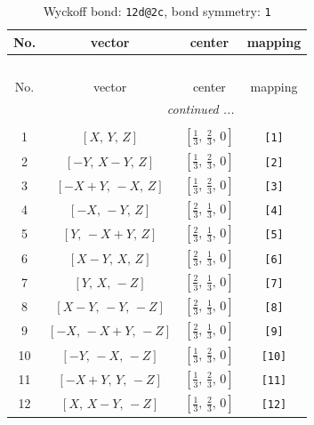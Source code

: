 \documentclass[fleqn,8pt]{jsarticle}
\begin{document}
\begin{longtable}{cccc}
\caption{Wyckoff bond: {\tt 12d@2c}, bond symmetry: {\tt 1}}
 \\
 \hline \hline
No. & vector & center & mapping \\ \hline \endfirsthead

\multicolumn{3}{l}{\tablename\ \thetable{}} \\
 \hline \hline
No. & vector & center & mapping \\ \hline \endhead

 \hline \hline
\multicolumn{3}{r}{\footnotesize\it continued ...} \\ \endfoot

 \hline \hline
\multicolumn{3}{r}{} \\ \endlastfoot

1 & $\left[ X,\, Y,\, Z \right]$ & $\left[ \frac{1}{3},\, \frac{2}{3},\, 0 \right]$ & {\tt [1]} \\ \hline
2 & $\left[ - Y,\, X - Y,\, Z \right]$ & $\left[ \frac{1}{3},\, \frac{2}{3},\, 0 \right]$ & {\tt [2]} \\ \hline
3 & $\left[ - X + Y,\, - X,\, Z \right]$ & $\left[ \frac{1}{3},\, \frac{2}{3},\, 0 \right]$ & {\tt [3]} \\ \hline
4 & $\left[ - X,\, - Y,\, Z \right]$ & $\left[ \frac{2}{3},\, \frac{1}{3},\, 0 \right]$ & {\tt [4]} \\ \hline
5 & $\left[ Y,\, - X + Y,\, Z \right]$ & $\left[ \frac{2}{3},\, \frac{1}{3},\, 0 \right]$ & {\tt [5]} \\ \hline
6 & $\left[ X - Y,\, X,\, Z \right]$ & $\left[ \frac{2}{3},\, \frac{1}{3},\, 0 \right]$ & {\tt [6]} \\ \hline
7 & $\left[ Y,\, X,\, - Z \right]$ & $\left[ \frac{2}{3},\, \frac{1}{3},\, 0 \right]$ & {\tt [7]} \\ \hline
8 & $\left[ X - Y,\, - Y,\, - Z \right]$ & $\left[ \frac{2}{3},\, \frac{1}{3},\, 0 \right]$ & {\tt [8]} \\ \hline
9 & $\left[ - X,\, - X + Y,\, - Z \right]$ & $\left[ \frac{2}{3},\, \frac{1}{3},\, 0 \right]$ & {\tt [9]} \\ \hline
10 & $\left[ - Y,\, - X,\, - Z \right]$ & $\left[ \frac{1}{3},\, \frac{2}{3},\, 0 \right]$ & {\tt [10]} \\ \hline
11 & $\left[ - X + Y,\, Y,\, - Z \right]$ & $\left[ \frac{1}{3},\, \frac{2}{3},\, 0 \right]$ & {\tt [11]} \\ \hline
12 & $\left[ X,\, X - Y,\, - Z \right]$ & $\left[ \frac{1}{3},\, \frac{2}{3},\, 0 \right]$ & {\tt [12]} \\
\end{longtable}
\end{document}
